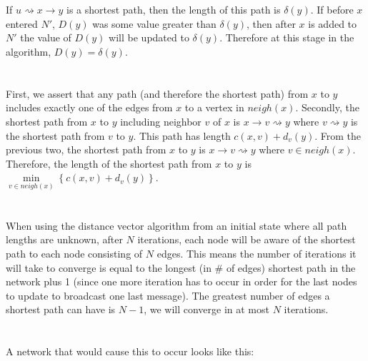 \documentclass[10pt,a4paper]{article}
\begin{document}
\section{}
If $u\rightsquigarrow x \rightarrow y$ is a shortest path, then the length of this path is $\delta(y)$. If before $x$ entered $N'$, $D(y)$ was some value greater than $\delta(y)$, then after $x$ is added to $N'$ the value of $D(y)$ will be updated to $\delta(y)$. Therefore at this stage in the algorithm, $D(y) = \delta(y)$.
\section{}
First, we assert that any path (and therefore the shortest path) from $x$ to $y$ includes exactly one of the edges from $x$ to a vertex in $neigh(x)$.
Secondly, the shortest path from $x$ to $y$ including neighbor $v$ of $x$ is $x \rightarrow v \rightsquigarrow y$ where $v \rightsquigarrow y$ is the shortest path from $v$ to $y$. This path has length $c(x,v) + d_v(y)$.
From the previous two, the shortest path from $x$ to $y$ is $x \rightarrow v \rightsquigarrow y$ where $v\in neigh(x)$.
Therefore, the length of the shortest path from $x$ to $y$ is $\min\limits_{v\in neigh(x)}\left\{c(x,v) + d_v(y)\right\}$.
\section{}
When using the distance vector algorithm from an initial state where all path lengths are unknown, after $N$ iterations, each node will be aware of the shortest path to each node consisting of $N$ edges. This means the number of iterations it will take to converge is equal to the longest (in \# of edges) shortest path in the network plus 1 (since one more iteration has to occur in order for the last nodes to update to broadcast one last message). The greatest number of edges a shortest path can have is $N - 1$, we will converge in at most $N$ iterations.
\section{}
A network that would cause this to occur looks like this:

\end{document}

